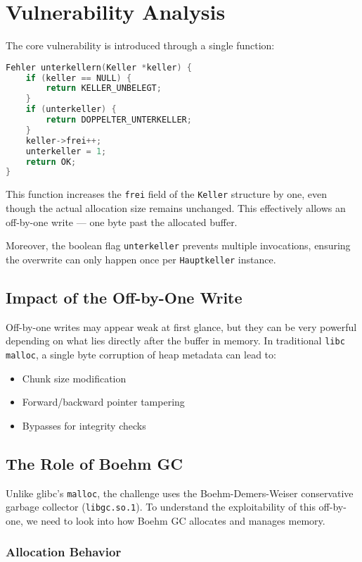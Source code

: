 \documentclass[a4paper,11pt]{article}
\begin{document}
\section{Vulnerability Analysis}

The core vulnerability is introduced through a single function:

\begin{lstlisting}[language=C]
Fehler unterkellern(Keller *keller) {
    if (keller == NULL) {
        return KELLER_UNBELEGT;
    }
    if (unterkeller) {
        return DOPPELTER_UNTERKELLER;
    }
    keller->frei++;
    unterkeller = 1;
    return OK;
}
\end{lstlisting}

This function increases the \texttt{frei} field of the \texttt{Keller} structure by one, even though the actual allocation size remains unchanged. This effectively allows an off-by-one write — one byte past the allocated buffer.

Moreover, the boolean flag \texttt{unterkeller} prevents multiple invocations, ensuring the overwrite can only happen once per \texttt{Hauptkeller} instance. 

\subsection*{Impact of the Off-by-One Write}
Off-by-one writes may appear weak at first glance, but they can be very powerful depending on what lies directly after the buffer in memory. In traditional \texttt{libc} \texttt{malloc}, a single byte corruption of heap metadata can lead to:
\begin{itemize}
    \item Chunk size modification
    \item Forward/backward pointer tampering
    \item Bypasses for integrity checks
\end{itemize}

\subsection*{The Role of Boehm GC}

Unlike glibc's \texttt{malloc}, the challenge uses the Boehm-Demers-Weiser conservative garbage collector (\texttt{libgc.so.1}). To understand the exploitability of this off-by-one, we need to look into how Boehm GC allocates and manages memory.

\subsubsection*{Allocation Behavior}
\end{document}
